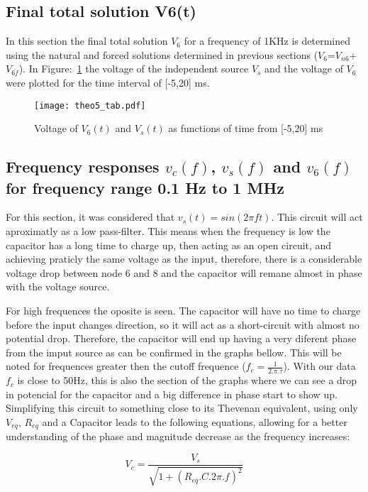 \pagebreak
\subsection{Final total solution V6(t)}
In this section the final total solution $V_6$ for a frequency of 1KHz is determined using the natural and forced solutions determined in previous sections ($V_6$=$V_{n6}$+$V_{6f}$). In {Figure:~\ref{fig:theo5}} the voltage of the independent source $V_{s}$ and the voltage of $V_{6}$ were plotted for the time interval of [-5,20] ms. 
\begin{figure}[H] \centering
\texttt{[image: theo5\_tab.pdf]}
\vspace{10px}
\caption{Voltage of $V_{6}(t)$ and $V_{s}(t)$ as functions of time from [-5,20] ms}
\label{fig:theo5}
\end{figure}

\subsection{Frequency responses $v_c(f)$, $v_s(f)$ and $v_6(f)$ for frequency range 0.1 Hz to 1 MHz}
\label{ref}
For this section, it was considered that $v_s( t) = sin( 2 \pi f t )$.
This circuit will act aproximatly as a low pass-filter. This means when the frequency is low the capacitor has a long time to charge up, then acting as an open circuit, and achieving praticly the same voltage as the input, therefore, there is a considerable voltage drop between node 6 and 8 and the capacitor will remane almost in phase with the voltage source.\par For high frequences the oposite is seen. The capacitor will have no time to charge before the input changes direction, so it will act as a short-circuit with almost no potential drop. Therefore, the capacitor will end up having a very diferent phase from the imput source as can be confirmed in the graphs bellow. This will be noted for frequences greater then the cutoff frequence ($f_c = \frac{1}{2.\pi.\tau}$). With our data $f_c$ is close to 50Hz, this is also the section of the graphs where we can see a drop in potencial for the capacitor and a big difference in phase start to show up.
Simplifying this circuit to something close to its Thevenan equivalent, using only $V_{eq}$, $R_{eq}$ and a Capacitor leads to the following equations, allowing for a better understanding of the phase and magnitude decrease as the frequency increases:

\begin{equation}
  V_c = \frac{V_s}{\sqrt{1 + (R_{eq}.C.2\pi.f)^2}}
  \label{eq:freqresp1}
\end{equation}

